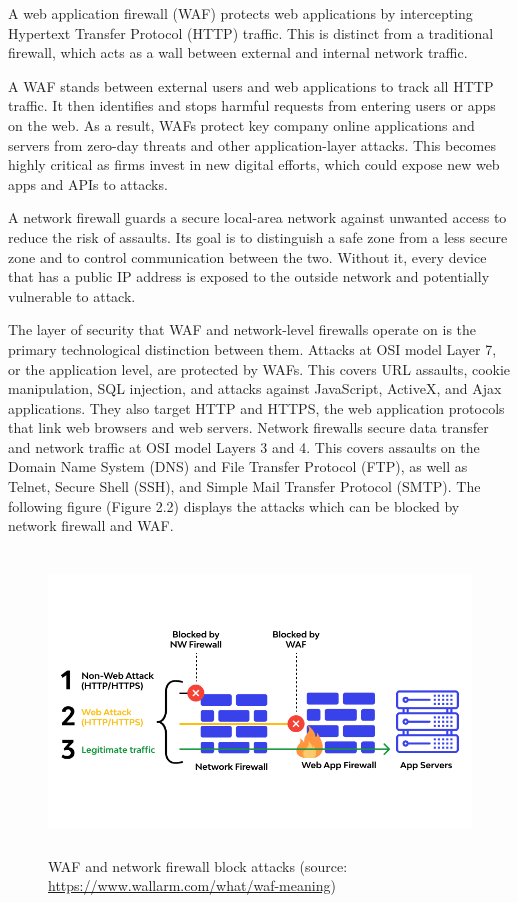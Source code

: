 A web application firewall (WAF) protects web applications by intercepting Hypertext Transfer Protocol (HTTP) traffic. This is distinct from a traditional firewall, which acts as a wall between external and internal network traffic.

A WAF stands between external users and web applications to track all HTTP traffic. It then identifies and stops harmful requests from entering users or apps on the web. As a result, WAFs protect key company online applications and servers from zero-day threats and other application-layer attacks. This becomes highly critical as firms invest in new digital efforts, which could expose new web apps and APIs to attacks.

A network firewall guards a secure local-area network against unwanted access to reduce the risk of assaults. Its goal is to distinguish a safe zone from a less secure zone and to control communication between the two. Without it, every device that has a public IP address is exposed to the outside network and potentially vulnerable to attack.

The layer of security that WAF and network-level firewalls operate on is the primary technological distinction between them. Attacks at OSI model Layer 7, or the application level, are protected by WAFs. This covers URL assaults, cookie manipulation, SQL injection, and attacks against JavaScript, ActiveX, and Ajax applications. They also target HTTP and HTTPS, the web application protocols that link web browsers and web servers. Network firewalls secure data transfer and network traffic at OSI model Layers 3 and 4. This covers assaults on the Domain Name System (DNS) and File Transfer Protocol (FTP), as well as Telnet, Secure Shell (SSH), and Simple Mail Transfer Protocol (SMTP). The following figure (Figure 2.2) displays the attacks which can be blocked by network firewall and WAF.
\begin{figure}[h!]
	\centering
	\includegraphics[width=\linewidth, height=8cm,keepaspectratio]{figures/waf3.png}
	\caption{WAF and network firewall block attacks (source: \url{https://www.wallarm.com/what/waf-meaning})}
\end{figure}
\newpage

